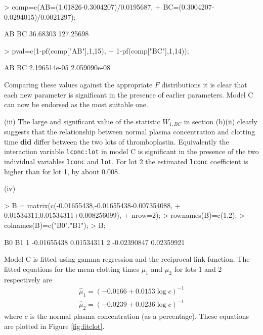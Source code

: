 \documentclass[a4paper,11pt]{article}
\begin{document}
\begin{Schunk}
\begin{Sinput}
> comp=c(AB=(1.01826-0.3004207)/0.0195687,
+        BC=(0.3004207-0.0294015)/0.0021297);
\end{Sinput}
\begin{Soutput}
       AB        BC 
 36.68303 127.25698 
\end{Soutput}
\begin{Sinput}
> pval=c(1-pf(comp["AB"],1,15),
+        1-pf(comp["BC"],1,14));
\end{Sinput}
\begin{Soutput}
          AB           BC 
2.196514e-05 2.059090e-08 
\end{Soutput}
\end{Schunk}
Comparing these values against the appropriate $F$ distributions it is clear that each new parameter is significant in the presence of earlier parameters. Model C can now be endorsed as the most suitable one.

(iii) The large and significant value of the statistic $W_{1,BC}$ in section (b)(ii) clearly suggests that the relationship between normal plasma concentration and clotting time {\bf did} differ between the two lots of thromboplastin. Equivalently the interaction variable \texttt{lconc:lot} in model C is significant in the presence of the two individual variables \texttt{lconc} and \texttt{lot}. For lot 2 the estimated \texttt{lconc} coefficient is higher than for lot 1, by about 0.008.

(iv)
\begin{Schunk}
\begin{Sinput}
> B = matrix(c(-0.01655438,-0.01655438-0.007354088,
+              0.01534311,0.01534311+0.008256099),
+              nrow=2);
> rownames(B)=c(1,2);
> colnames(B)=c("B0","B1");
> B;
\end{Sinput}
\begin{Soutput}
           B0         B1
1 -0.01655438 0.01534311
2 -0.02390847 0.02359921
\end{Soutput}
\end{Schunk}
Model C is fitted using gamma regression and the reciprocal link function. The fitted equations for the mean clotting times $\mu_1$ and $\mu_2$ for lots 1 and 2 respectively are
\begin{eqnarray*}
\hat\mu_1 = (-0.0166 + 0.0153\log c)^{-1}\\
\hat\mu_2 = (-0.0239 + 0.0236\log c)^{-1}
\end{eqnarray*}
where $c$ is the normal plasma concentration (as a percentage). These equations are plotted in Figure \ref{fig:fitclot}.
\end{document}
